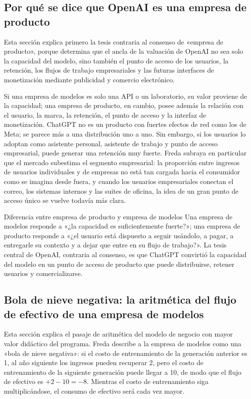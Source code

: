 \documentclass[a4paper]{article}
\begin{document}
\subsection{Por qué se dice que OpenAI es una empresa de producto}

Esta sección explica primero la tesis contraria al consenso de «empresa de producto», porque determina que el ancla de la valuación de OpenAI no sea solo la capacidad del modelo, sino también el punto de acceso de los usuarios, la retención, los flujos de trabajo empresariales y las futuras interfaces de monetización mediante publicidad y comercio electrónico.

Si una empresa de modelos es solo una API o un laboratorio, su valor proviene de la capacidad; una empresa de producto, en cambio, posee además la relación con el usuario, la marca, la retención, el punto de acceso y la interfaz de monetización. ChatGPT no es un producto con fuertes efectos de red como los de Meta; se parece más a una distribución uno a uno. Sin embargo, si los usuarios lo adoptan como asistente personal, asistente de trabajo y punto de acceso empresarial, puede generar una retención muy fuerte. Freda subraya en particular que el mercado subestima el segmento empresarial: la proporción entre ingresos de usuarios individuales y de empresas no está tan cargada hacia el consumidor como se imagina desde fuera, y cuando los usuarios empresariales conectan el correo, los sistemas internos y las suites de oficina, la idea de un gran punto de acceso único se vuelve todavía más clara.

\begin{importantbox}{Diferencia entre empresa de producto y empresa de modelos}
Una empresa de modelos responde a «¿la capacidad es suficientemente fuerte?»; una empresa de producto responde a «¿el usuario está dispuesto a seguir usándolo, a pagar, a entregarle su contexto y a dejar que entre en su flujo de trabajo?». La tesis central de OpenAI, contraria al consenso, es que ChatGPT convirtió la capacidad del modelo en un punto de acceso de producto que puede distribuirse, retener usuarios y comercializarse.
\end{importantbox}

\subsection{Bola de nieve negativa: la aritmética del flujo de efectivo de una empresa de modelos}

Esta sección explica el pasaje de aritmética del modelo de negocio con mayor valor didáctico del programa. Freda describe a la empresa de modelos como una «bola de nieve negativa»: si el costo de entrenamiento de la generación anterior es 1, al año siguiente los ingresos pueden recuperar 2, pero el costo de entrenamiento de la siguiente generación puede llegar a 10, de modo que el flujo de efectivo es \(+2-10=-8\). Mientras el costo de entrenamiento siga multiplicándose, el consumo de efectivo será cada vez mayor.
\end{document}
